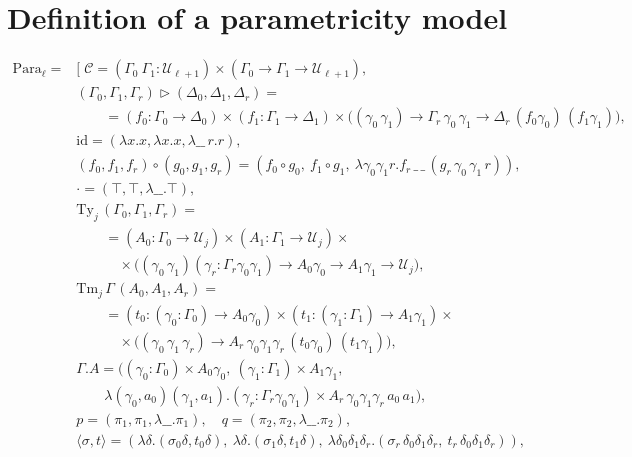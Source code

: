 \section{Definition of a parametricity model}
\label{twoltt-parametricity-model-def}

\[\begin{array}{ll}
    \mathrm{Para}_\ell = &[\;
\mathcal C=(\Gamma_0\ \Gamma_1:\mathcal U_{\ell+1})\times(\Gamma_0\to\Gamma_1\to\mathcal U_{\ell+1}),\\
&(\Gamma_0,\Gamma_1,\Gamma_r)\triangleright(\Delta_0,\Delta_1,\Delta_r)=\\ &\qquad=(f_0:\Gamma_0\to\Delta_0)\times(f_1:\Gamma_1\to\Delta_1)\times
 \big((\gamma_0\,\gamma_1)\to\Gamma_r\,\gamma_0\,\gamma_1\to\Delta_r\,(f_0\gamma_0)\,(f_1\gamma_1)\big),\\
&\mathrm{id}=(\lambda x.x,\lambda x.x,\lambda\_\_\,r.r),\\
&(f_0,f_1,f_r)\circ(g_0,g_1,g_r)=(f_0\circ g_0,\ f_1\circ g_1,\ \lambda\gamma_0\gamma_1 r.f_r\,\_\,\_\,(g_r\,\gamma_0\,\gamma_1\,r)),\\
&\cdot=(\top,\top,\lambda\_\_.\top),\\
&\mathrm{Ty}_j\,(\Gamma_0,\Gamma_1,\Gamma_r)=\\&\qquad=
(A_0:\Gamma_0\to\mathcal U_j)\times(A_1:\Gamma_1\to\mathcal U_j)\times\\&\qquad\quad\times
 \big((\gamma_0\,\gamma_1)(\gamma_r:\Gamma_r\gamma_0\gamma_1)\to A_0\gamma_0\to A_1\gamma_1\to\mathcal U_j\big),\\
&\mathrm{Tm}_j\,\Gamma\,(A_0,A_1,A_r)=\\&\qquad=(t_0:(\gamma_0:\Gamma_0)\to A_0\gamma_0)\times(t_1:(\gamma_1:\Gamma_1)\to A_1\gamma_1)\times\\&\qquad\quad\times
 \big((\gamma_0\,\gamma_1\,\gamma_r)\to A_r\,\gamma_0\gamma_1\gamma_r\,(t_0\gamma_0)\,(t_1\gamma_1)\big),\\
&\Gamma.A=\big((\gamma_0:\Gamma_0)\times A_0\gamma_0,\ (\gamma_1:\Gamma_1)\times A_1\gamma_1,\\&\qquad
 \lambda(\gamma_0,a_0)(\gamma_1,a_1).(\gamma_r:\Gamma_r\gamma_0\gamma_1)\times A_r\,\gamma_0\gamma_1\gamma_r\,a_0\,a_1\big),\\
&p=(\pi_1,\pi_1,\lambda\_\_.\pi_1),\quad q=(\pi_2,\pi_2,\lambda\_\_.\pi_2),\\
&\langle\sigma,t\rangle=(\lambda\delta.(\sigma_0\delta,t_0\delta),\ \lambda\delta.(\sigma_1\delta,t_1\delta),\
 \lambda\delta_0\delta_1\delta_r.(\sigma_r\,\delta_0\delta_1\delta_r,\ t_r\,\delta_0\delta_1\delta_r)),\\

\end{array}\]
